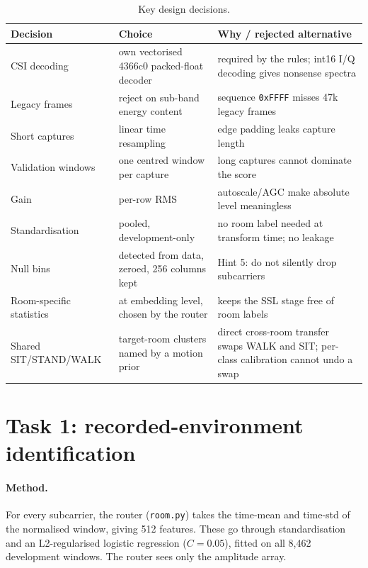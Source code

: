 \documentclass[11pt,a4paper]{article}
\begin{document}
\begin{table}[H]
\centering\small
\caption{Key design decisions.}
\label{tab:rationale}
\begin{tabular}{p{3.3cm}p{5.6cm}p{6.2cm}}
\toprule
Decision & Choice & Why / rejected alternative\\
\midrule
CSI decoding & own vectorised 4366c0 packed-float decoder & required by the rules; int16 I/Q decoding gives nonsense spectra\\
Legacy frames & reject on sub-band energy content & sequence \texttt{0xFFFF} misses 47k legacy frames\\
Short captures & linear time resampling & edge padding leaks capture length\\
Validation windows & one centred window per capture & long captures cannot dominate the score\\
Gain & per-row RMS & autoscale/AGC make absolute level meaningless\\
Standardisation & pooled, development-only & no room label needed at transform time; no leakage\\
Null bins & detected from data, zeroed, 256 columns kept & Hint 5: do not silently drop subcarriers\\
Room-specific statistics & at embedding level, chosen by the router & keeps the SSL stage free of room labels\\
Shared SIT/STAND/WALK & target-room clusters named by a motion prior & direct cross-room transfer swaps WALK and SIT; per-class calibration cannot undo a swap\\
\bottomrule
\end{tabular}
\end{table}

\section{Task 1: recorded-environment identification}

\paragraph{Method.} For every subcarrier, the router (\texttt{room.py}) takes the time-mean and time-std of the normalised window, giving 512 features. These go through standardisation and an L2-regularised logistic regression ($C=0.05$), fitted on all 8{,}462 development windows. The router sees only the amplitude array.
\end{document}
